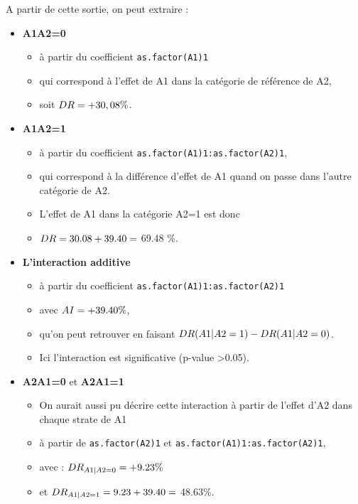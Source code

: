 \documentclass[
]{book}
\providecommand{\tightlist}{%
  \setlength{\itemsep}{0pt}\setlength{\parskip}{0pt}}
\begin{document}
A partir de cette sortie, on peut extraire :

\begin{itemize}
\tightlist
\item
  \textbf{A1\textbar A2=0}

  \begin{itemize}
  \tightlist
  \item
    à partir du coefficient \texttt{as.factor(A1)1}
  \item
    qui correspond à l'effet de A1 dans la catégorie de référence de A2,
  \item
    soit \(\small DR = +30,08 \%\).
  \end{itemize}
\item
  \textbf{A1\textbar A2=1}

  \begin{itemize}
  \tightlist
  \item
    à partir du coefficient \texttt{as.factor(A1)1:as.factor(A2)1},
  \item
    qui correspond à la différence d'effet de A1 quand on passe dans l'autre catégorie de A2.
  \item
    L'effet de A1 dans la catégorie A2=1 est donc
  \item
    \(\small DR = 30.08+39.40 =\) 69.48 \%.
  \end{itemize}
\item
  \textbf{L'interaction additive}

  \begin{itemize}
  \tightlist
  \item
    à partir du coefficient \texttt{as.factor(A1)1:as.factor(A2)1}
  \item
    avec \(\small AI = +39.40 \%\),
  \item
    qu'on peut retrouver en faisant \(\small DR(A1|A2=1) - DR(A1|A2=0)\).
  \item
    Ici l'interaction est significative (p-value \textgreater0.05).
  \end{itemize}
\item
  \textbf{A2\textbar A1=0} et \textbf{A2\textbar A1=1}

  \begin{itemize}
  \tightlist
  \item
    On aurait aussi pu décrire cette interaction à partir de l'effet d'A2 dans chaque strate de A1
  \item
    à partir de \texttt{as.factor(A2)1} et \texttt{as.factor(A1)1:as.factor(A2)1},
  \item
    avec : \(\small DR_{A1|A2=0} = +9.23\%\)
  \item
    et \(\small DR_{A1|A2=1} = 9.23+39.40 =\) 48.63\%.
  \end{itemize}
\end{itemize}
\end{document}
